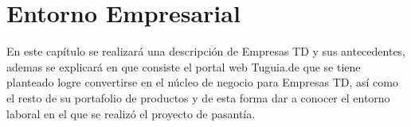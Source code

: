 \chapter{Entorno Empresarial} \label{chap:entorno}

\vspace{5 mm}

En este capítulo se realizará una descripción de Empresas TD y sus antecedentes, ademas se explicará en que consiste el portal web Tuguia.de que se tiene planteado logre convertirse en el núcleo de negocio para Empresas TD, así como el resto de su portafolio de productos y de esta forma dar a conocer el entorno laboral en el que se realizó el proyecto de pasantía.

  